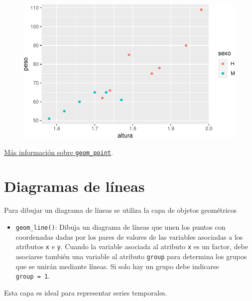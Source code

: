 \documentclass[
  a4paper,
]{scrreport}
\providecommand{\tightlist}{%
  \setlength{\itemsep}{0pt}\setlength{\parskip}{0pt}}\usepackage{longtable,booktabs,array}
\theoremstyle{definition}
\theoremstyle{definition}
\theoremstyle{remark}
\begin{document}
\begin{figure}[H]

{\centering \includegraphics{./07-graficos_files/figure-pdf/unnamed-chunk-5-1.pdf}

}

\end{figure}

\href{https://ggplot2.tidyverse.org/reference/geom_point.html}{Más
información sobre \texttt{geom\_point}}.

\hypertarget{diagramas-de-luxedneas}{%
\section{Diagramas de líneas}\label{diagramas-de-luxedneas}}

Para dibujar un diagrama de líneas se utiliza la capa de objetos
geométricos

\begin{itemize}
\tightlist
\item
  \texttt{geom\_line()}: Dibuja un diagrama de líneas que unen los
  puntos con coordenadas dadas por los pares de valores de las variables
  asociadas a los atributos \texttt{x} e \texttt{y}. Cuando la variable
  asociada al atributo \texttt{x} es un factor, debe asociarse también
  una variable al atributo \texttt{group} para determina los grupos que
  se unirán mediante líneas. Si solo hay un grupo debe indicarse
  \texttt{group\ =\ 1}.
\end{itemize}

Esta capa es ideal para representar series temporales.
\end{document}
